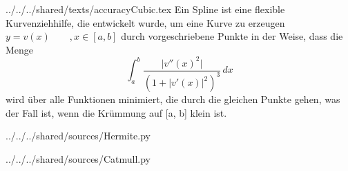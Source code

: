 \begin{filecontents*}[overwrite]{../../../shared/texts/accuracyCubic.tex}
Ein Spline ist eine flexible Kurvenziehhilfe, die entwickelt wurde, um 
eine Kurve zu erzeugen \(y=v(x) \hspace{2em},x \in [a,b]\) durch 
vorgeschriebene Punkte in der Weise, dass die Menge 
\[ \int_{a}^{b} \frac{\lvert v''(x)^2 \rvert}{(1 +  \lvert v'(x) \rvert^2)^3}  \,dx \]
\noindent wird über alle Funktionen minimiert, die durch die gleichen 
Punkte gehen, was der Fall ist, wenn die Krümmung auf [a, b] klein ist.\cite{Accuracy}
\end{filecontents*}

\begin{filecontents*}[overwrite]{../../../shared/sources/Hermite.py}

\end{filecontents*}

\begin{filecontents*}[overwrite]{../../../shared/sources/Catmull.py}

\end{filecontents*}






\pgfplotsset{ymin=-10, ymax=45,
	xtick distance=2,
	ytick distance=10
}




